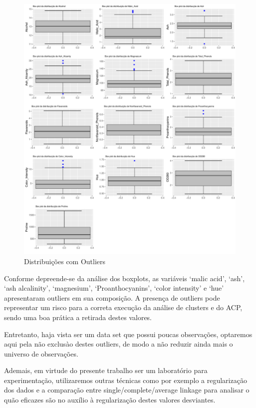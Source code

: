 \documentclass[
  letterpaper,
  DIV=11,
  numbers=noendperiod]{scrartcl}
\begin{document}
\begin{figure}[H]

{\centering \includegraphics{wines_analysis_files/figure-pdf/unnamed-chunk-5-1.pdf}

}

\caption{Distribuições com Outliers}

\end{figure}%

\newpage{}

Conforme depreende-se da análise dos boxplots, as variáveis `malic
acid', `ash', `ash alcalinity', `magnesium', `Proanthocyanins', `color
intensity' e `hue' apresentaram outliers em sua composição. A presença
de outliers pode representar um risco para a correta execução da análise
de clusters e do ACP, sendo uma boa prática a retirada destes valores.

Entretanto, haja vista ser um data set que possui poucas observações,
optaremos aqui pela não exclusào destes outliers, de modo a não reduzir
ainda mais o universo de observações.

Ademais, em virtude do presente trabalho ser um laboratório para
experimentação, utilizaremos outras técnicas como por exemplo a
regularização dos dados e a comparação entre single/complete/average
linkage para analisar o quão eficazes são no auxílio à regularização
destes valores desviantes.
\end{document}
